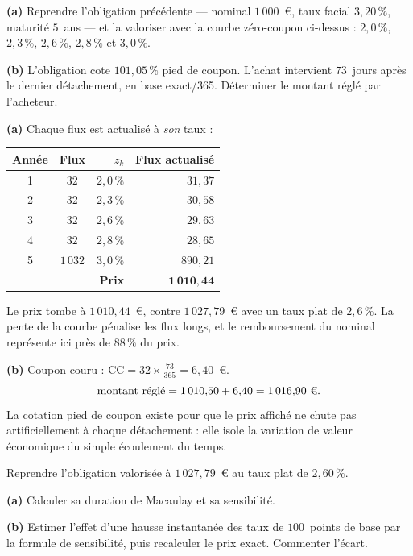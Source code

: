 \begin{exercice}
\textbf{(a)} Reprendre l'obligation précédente --- nominal $1\,000$~\euro, taux
facial $3{,}20\,\%$, maturité $5$~ans --- et la valoriser avec la courbe
zéro-coupon ci-dessus : $2{,}0\,\%$, $2{,}3\,\%$, $2{,}6\,\%$, $2{,}8\,\%$ et
$3{,}0\,\%$.

\medskip
\textbf{(b)} L'obligation cote $101{,}05\,\%$ pied de coupon. L'achat intervient
$73$~jours après le dernier détachement, en base exact/365. Déterminer le montant
réglé par l'acheteur.
\end{exercice}

\begin{corrige}
\textbf{(a)} Chaque flux est actualisé à \emph{son} taux :
\begin{center}\small
\begin{tabular}{ccrr}
\toprule
Année & Flux & $z_k$ & Flux actualisé \\
\midrule
1 & $32$    & $2{,}0\,\%$ & $31{,}37$ \\
2 & $32$    & $2{,}3\,\%$ & $30{,}58$ \\
3 & $32$    & $2{,}6\,\%$ & $29{,}63$ \\
4 & $32$    & $2{,}8\,\%$ & $28{,}65$ \\
5 & $1\,032$ & $3{,}0\,\%$ & $890{,}21$ \\
\midrule
\multicolumn{3}{r}{\textbf{Prix}} & $\mathbf{1\,010{,}44}$ \\
\bottomrule
\end{tabular}
\end{center}
Le prix tombe à $1\,010{,}44$~\euro, contre $1\,027{,}79$~\euro{} avec un taux
plat de $2{,}6\,\%$. La pente de la courbe pénalise les flux longs, et le
remboursement du nominal représente ici près de $88\,\%$ du prix.

\medskip
\textbf{(b)} Coupon couru : $\mathrm{CC} = 32 \times \tfrac{73}{365} = 6{,}40$~\euro.
\[
  \text{montant réglé} = 1\,010{,}50 + 6{,}40 = 1\,016{,}90\ \text{\euro}.
\]
La cotation pied de coupon existe pour que le prix affiché ne chute pas
artificiellement à chaque détachement : elle isole la variation de valeur
économique du simple écoulement du temps.
\end{corrige}

\begin{exercice}
Reprendre l'obligation valorisée à $1\,027{,}79$~\euro{} au taux plat de
$2{,}60\,\%$.

\textbf{(a)} Calculer sa duration de Macaulay et sa sensibilité.

\textbf{(b)} Estimer l'effet d'une hausse instantanée des taux de $100$~points de
base par la formule de sensibilité, puis recalculer le prix exact. Commenter
l'écart.
\end{exercice}

